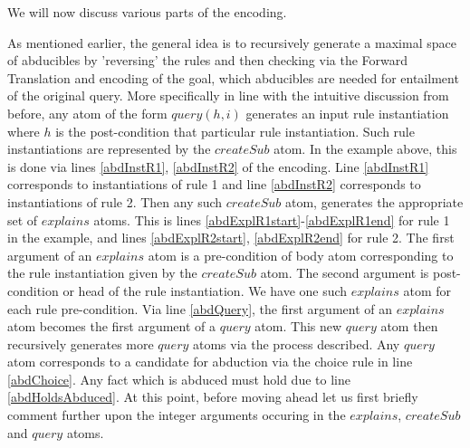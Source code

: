 We will now discuss various parts of the encoding.

As mentioned earlier, the general idea is to recursively generate a
maximal space of abducibles by 'reversing' the rules and then checking via the
Forward Translation and encoding of the goal, which abducibles are needed
for entailment of the original query. More specifically in line with the intuitive discussion from before, any atom
of the form $query(h,i)$ generates an input rule instantiation where $h$ is
the post-condition that particular rule instantiation. Such rule
instantiations are represented by the $createSub$ atom. In the example above,
this is done via lines \ref{abdInstR1}, \ref{abdInstR2} of the encoding. Line \ref{abdInstR1} corresponds to
instantiations of rule 1 and line \ref{abdInstR2} corresponds to instantiations of rule
2. Then any such $createSub$ atom, generates the appropriate set of $explains$
atoms. This is lines \ref{abdExplR1start}-\ref{abdExplR1end} for rule 1 in the example, and lines \ref{abdExplR2start}, \ref{abdExplR2end} for
rule 2. The first argument of an $explains$ atom is a pre-condition of body
atom corresponding to the rule instantiation given by the $createSub$
atom. The second argument is post-condition or head of the rule
instantiation. We have one such $explains$ atom for each rule
pre-condition. Via line \ref{abdQuery}, the first argument of an $explains$ atom becomes
the first argument of a $query$ atom. This new $query$ atom then recursively
generates more $query$ atoms via the process described. Any $query$ atom
corresponds to a candidate for abduction via the choice rule in line \ref{abdChoice}. Any
fact which is abduced must hold due to line \ref{abdHoldsAbduced}. At this point, before moving
ahead let us first briefly comment further upon the integer arguments occuring in the
$explains$, $createSub$ and $query$ atoms.

